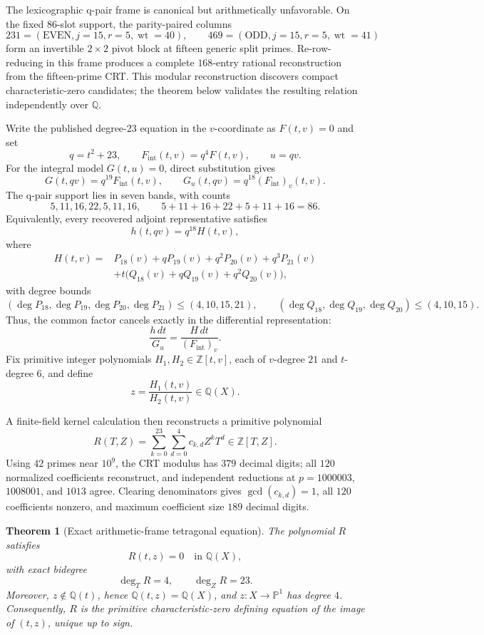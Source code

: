 \documentclass[11pt]{article}
\newtheorem{theorem}{Theorem}[section]
\newcommand{\Q}{\mathbb Q}
\newcommand{\PP}{\mathbb P}
\begin{document}
The lexicographic q-pair frame is canonical but arithmetically unfavorable.  On the fixed $86$-slot support, the parity-paired columns
\[
 231=(\mathrm{EVEN},j=15,r=5,\operatorname{wt}=40),\qquad
 469=(\mathrm{ODD},j=15,r=5,\operatorname{wt}=41)
\]
form an invertible $2\times2$ pivot block at fifteen generic split primes.  Re-row-reducing in this frame produces a complete $168$-entry rational reconstruction from the fifteen-prime CRT\@.  This modular reconstruction discovers compact characteristic-zero candidates; the theorem below validates the resulting relation independently over $\Q$.

Write the published degree-$23$ equation in the $v$-coordinate as $F(t,v)=0$ and set
\[
 q=t^2+23,\qquad F_{\mathrm{int}}(t,v)=q^4F(t,v),\qquad u=qv.
\]
For the integral model $G(t,u)=0$, direct substitution gives
\[
 G(t,qv)=q^{19}F_{\mathrm{int}}(t,v),
 \qquad
 G_u(t,qv)=q^{18}(F_{\mathrm{int}})_v(t,v).
\]
The q-pair support lies in seven bands, with counts
\[
 5,11,16,22,5,11,16,
 \qquad 5+11+16+22+5+11+16=86.
\]
Equivalently, every recovered adjoint representative satisfies
\[
 h(t,qv)=q^{18}H(t,v),
\]
where
\[
\begin{aligned}
H(t,v)={}&P_{18}(v)+qP_{19}(v)+q^2P_{20}(v)+q^3P_{21}(v)\\
&+t\bigl(Q_{18}(v)+qQ_{19}(v)+q^2Q_{20}(v)\bigr),
\end{aligned}
\]
with degree bounds
\[
(\deg P_{18},\deg P_{19},\deg P_{20},\deg P_{21})\le(4,10,15,21),
\qquad
(\deg Q_{18},\deg Q_{19},\deg Q_{20})\le(4,10,15).
\]
Thus, the common factor cancels exactly in the differential representation:
\[
 \frac{h\,dt}{G_u}
 =\frac{H\,dt}{(F_{\mathrm{int}})_v}.
\]
Fix primitive integer polynomials $H_1,H_2\in\mathbb Z[t,v]$, each of $v$-degree $21$ and $t$-degree $6$, and define
\[
 z=\frac{H_1(t,v)}{H_2(t,v)}\in\Q(X).
\]

A finite-field kernel calculation then reconstructs a primitive polynomial
\[
 R(T,Z)=\sum_{k=0}^{23}\sum_{d=0}^{4}c_{k,d}Z^kT^d\in\mathbb Z[T,Z].
\]
Using $42$ primes near $10^9$, the CRT modulus has $379$ decimal digits; all $120$ normalized coefficients reconstruct, and independent reductions at $p=1000003$, $1008001$, and $1013$ agree.  Clearing denominators gives $\gcd(c_{k,d})=1$, all $120$ coefficients nonzero, and maximum coefficient size $189$ decimal digits.

\begin{theorem}[Exact arithmetic-frame tetragonal equation]\label{thm:exact-arithmetic-frame}
The polynomial $R$ satisfies
\[
 R(t,z)=0\quad\text{in }\Q(X),
\]
with exact bidegree
\[
 \deg_T R=4,\qquad \deg_Z R=23.
\]
Moreover, $z\notin\Q(t)$, hence $\Q(t,z)=\Q(X)$, and $z:X\to\PP^1$ has degree $4$.  Consequently, $R$ is the primitive characteristic-zero defining equation of the image of $(t,z)$, unique up to sign.
\end{theorem}
\end{document}
